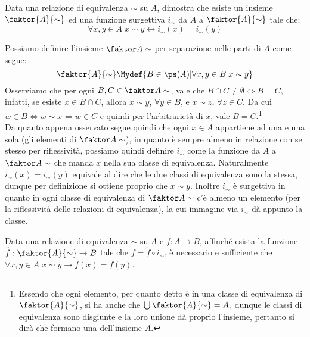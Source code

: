 \documentclass[11pt]{scrartcl}
\begin{document}
\begin{exercise}
	\label{3.73}
	Data una relazione di equivalenza $\sim$ su $A$, dimostra che esiste un insieme $\faktor{A}{\sim}$ ed una funzione surgettiva $i_\sim$ da $A$ a $\faktor{A}{\sim}$
	tale che:
	\[ \forall x,y \in A \; x \sim y \leftrightarrow i_\sim(x) = i_\sim(y)
		\]
\end{exercise}

\begin{soln}
	Possiamo definire l'insieme $\faktor A \sim$ per separazione nelle parti di $A$ come segue:
	\[ \faktor{A}{\sim} \Mydef \{B \in \ps(A) | \forall x,y \in B \; x \sim y\}
		\]
	Osserviamo che per ogni $B, C \in \faktor A \sim$, vale che $B \cap C \ne \emptyset \iff B = C$, infatti, se esiste $x \in B \cap C$, allora $x \sim y$, $\forall y \in B$, e $x \sim z$, $\forall z \in C$.
	Da cui $w \in B \iff w \sim x \iff w \in C$ e quindi per l'arbitrarietà di $x$, vale $B = C$.\footnote{Essendo che ogni elemento, per quanto detto è in una classe di equivalenza di $\faktor{A}{\sim}$, si ha anche che $\bigcup \faktor{A}{\sim} = A$, dunque le classi di equivalenza sono disgiunte
	e la loro unione dà proprio l'insieme, pertanto si dirà che formano una  dell'insieme $A$.}\\
	Da quanto appena osservato segue quindi che ogni $x \in A$ appartiene ad una e una sola  (gli elementi di $\faktor A\sim$), in quanto è sempre almeno in relazione con se stesso per riflessività, possiamo quindi definire $i_\sim$ come 
	la funzione da $A$ a $\faktor A \sim$ che manda $x$ nella sua classe di equivalenza. Naturalmente $i_\sim(x) = i_\sim(y)$ equivale al dire che le due classi di equivalenza sono la stessa, dunque per definizione
	si ottiene proprio che $x \sim y$. Inoltre $i_\sim$ è surgettiva in quanto in ogni classe di equivalenza di $\faktor A \sim$ c'è almeno un elemento (per la riflessività delle relazioni di equivalenza), la cui immagine via $i_\sim$ dà appunto la classe.
\end{soln}

\begin{exercise}
	Data una relazione di equivalenza $\sim$ su $A$ e $f : A \rightarrow B$, affinché esista la funzione $\widetilde{f}: \faktor{A}{\sim} \rightarrow B$ tale che $f = \widetilde{f} \circ i_\sim$,
	è necessario e sufficiente che $\forall x,y \in A \; x \sim y \rightarrow f(x) = f(y)$.
\end{exercise}
\end{document}
